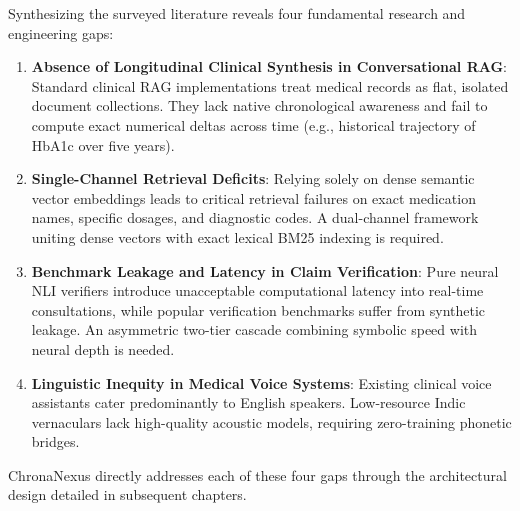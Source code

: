 Synthesizing the surveyed literature reveals four fundamental research and engineering gaps:
\begin{enumerate}
    \item \textbf{Absence of Longitudinal Clinical Synthesis in Conversational RAG}: Standard clinical RAG implementations treat medical records as flat, isolated document collections. They lack native chronological awareness and fail to compute exact numerical deltas across time (e.g., historical trajectory of HbA1c over five years).
    \item \textbf{Single-Channel Retrieval Deficits}: Relying solely on dense semantic vector embeddings leads to critical retrieval failures on exact medication names, specific dosages, and diagnostic codes. A dual-channel framework uniting dense vectors with exact lexical BM25 indexing is required.
    \item \textbf{Benchmark Leakage and Latency in Claim Verification}: Pure neural NLI verifiers introduce unacceptable computational latency into real-time consultations, while popular verification benchmarks suffer from synthetic leakage. An asymmetric two-tier cascade combining symbolic speed with neural depth is needed.
    \item \textbf{Linguistic Inequity in Medical Voice Systems}: Existing clinical voice assistants cater predominantly to English speakers. Low-resource Indic vernaculars lack high-quality acoustic models, requiring zero-training phonetic bridges.
\end{enumerate}

ChronaNexus directly addresses each of these four gaps through the architectural design detailed in subsequent chapters.

\newpage
